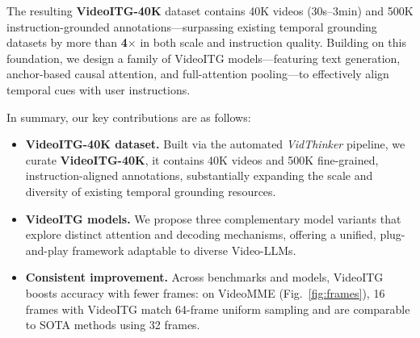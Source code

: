 The resulting \textbf{VideoITG-40K} dataset contains 40K videos (30s–3min) and 500K instruction-grounded annotations—surpassing existing temporal grounding datasets by more than \textbf{4$\times$} in both scale and instruction quality. 
Building on this foundation, we design a family of VideoITG models—featuring text generation, anchor-based causal attention, and full-attention pooling—to effectively align temporal cues with user instructions. 

In summary, our key contributions are as follows:
\begin{itemize}[leftmargin=6mm, itemsep=3pt, parsep=0pt, topsep=2pt]
    \item \textbf{VideoITG-40K dataset.} 
    Built via the automated \textit{VidThinker} pipeline, we curate \textbf{VideoITG-40K}, it contains 40K videos and 500K fine-grained, instruction-aligned annotations, substantially expanding the scale and diversity of existing temporal grounding resources.
    \item \textbf{VideoITG models.} 
    We propose three complementary model variants that explore distinct attention and decoding mechanisms, offering a unified, plug-and-play framework adaptable to diverse Video-LLMs.
    \item \textbf{Consistent improvement.} 
    Across benchmarks and models, VideoITG boosts accuracy with fewer frames: on VideoMME (Fig.~\ref{fig:frames}), 16 frames with VideoITG match 64-frame uniform sampling and are comparable to SOTA methods using 32 frames.
\end{itemize}
